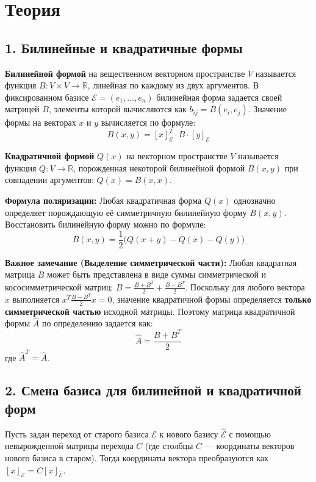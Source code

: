 \section*{Теория}

\subsection*{1. Билинейные и квадратичные формы}

\begin{definition}
\textbf{Билинейной формой} на вещественном векторном пространстве $V$ называется функция $B: V \times V \to \mathbb{R}$, линейная по каждому из двух аргументов. 
В фиксированном базисе $\mathcal{E} = (e_1, \dots, e_n)$ билинейная форма задается своей матрицей $B$, элементы которой вычисляются как $b_{ij} = B(e_i, e_j)$. Значение формы на векторах $x$ и $y$ вычисляется по формуле:
\[
B(x,y) = [x]_\mathcal{E}^T \cdot B \cdot [y]_\mathcal{E}
\]
\end{definition}

\begin{definition}
\textbf{Квадратичной формой} $Q(x)$ на векторном пространстве $V$ называется функция $Q: V \to \mathbb{R}$, порожденная некоторой билинейной формой $B(x,y)$ при совпадении аргументов: $Q(x) = B(x,x)$.
\end{definition}

\textbf{Формула поляризации:} 
Любая квадратичная форма $Q(x)$ однозначно определяет порождающую её симметричную билинейную форму $B(x,y)$. Восстановить билинейную форму можно по формуле:
\[
B(x,y) = \frac{1}{2}\big( Q(x+y) - Q(x) - Q(y) \big)
\]

\textbf{Важное замечание (Выделение симметрической части):} 
Любая квадратная матрица $B$ может быть представлена в виде суммы симметрической и кососимметрической матриц: $B = \frac{B+B^T}{2} + \frac{B-B^T}{2}$.
Поскольку для любого вектора $x$ выполняется $x^T \frac{B-B^T}{2} x = 0$, значение квадратичной формы определяется \textbf{только симметрической частью} исходной матрицы.
Поэтому матрица квадратичной формы $\hat{A}$ по определению задается как:
\[
\hat{A} = \frac{B + B^T}{2}
\]
где $\hat{A}^T = \hat{A}$.

\subsection*{2. Смена базиса для билинейной и квадратичной форм}

Пусть задан переход от старого базиса $\mathcal{E}$ к нового базису $\mathcal{\hat{E}}$ с помощью невырожденной матрицы перехода $C$ (где столбцы $C$ — координаты векторов нового базиса в старом). 
Тогда координаты вектора преобразуются как $[x]_\mathcal{E} = C [x]_\mathcal{\hat{E}}$.

